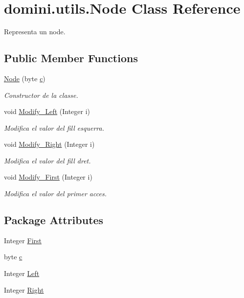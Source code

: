 \hypertarget{classdomini_1_1utils_1_1Node}{}\section{domini.\+utils.\+Node Class Reference}
\label{classdomini_1_1utils_1_1Node}


Representa un node.  


\subsection*{Public Member Functions}
\begin{DoxyCompactItemize}
\item 
\hyperlink{classdomini_1_1utils_1_1Node_ae337ba617322158f0ac240c900350278}{Node} (byte \hyperlink{classdomini_1_1utils_1_1Node_a2fbef2557db813ae02a2d52032eaa6e1}{c})
\begin{DoxyCompactList}\small\item\em Constructor de la classe. \end{DoxyCompactList}\item 
void \hyperlink{classdomini_1_1utils_1_1Node_a5a1cbd1e7f1fd78b42050f563520a709}{Modify\+\_\+\+Left} (Integer i)
\begin{DoxyCompactList}\small\item\em Modifica el valor del fill esquerra. \end{DoxyCompactList}\item 
void \hyperlink{classdomini_1_1utils_1_1Node_a58d22f8330339b6d807cdef44d0eddf6}{Modify\+\_\+\+Right} (Integer i)
\begin{DoxyCompactList}\small\item\em Modifica el valor del fill dret. \end{DoxyCompactList}\item 
void \hyperlink{classdomini_1_1utils_1_1Node_a3fe2e958308c90d24607a4e191680089}{Modify\+\_\+\+First} (Integer i)
\begin{DoxyCompactList}\small\item\em Modifica el valor del primer acces. \end{DoxyCompactList}\end{DoxyCompactItemize}
\subsection*{Package Attributes}
\begin{DoxyCompactItemize}
\item 
Integer \hyperlink{classdomini_1_1utils_1_1Node_a42db9f259f129c72cab2052a0f8ba42a}{First}
\item 
byte \hyperlink{classdomini_1_1utils_1_1Node_a2fbef2557db813ae02a2d52032eaa6e1}{c}
\item 
Integer \hyperlink{classdomini_1_1utils_1_1Node_a2f1d911cf52953b29d42e5e020b82dbf}{Left}
\item 
Integer \hyperlink{classdomini_1_1utils_1_1Node_a73c97e595bad2513ee0a06ee4620236a}{Right}
\end{DoxyCompactItemize}


